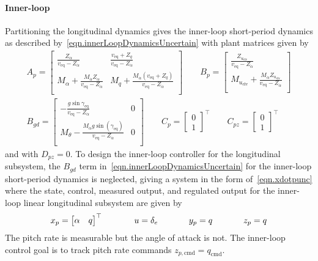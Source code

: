 \paragraph{Inner-loop}
Partitioning the longitudinal dynamics gives the inner-loop short-period dynamics as described by\ \eqref{eqn.innerLoopDynamicsUncertain} with plant matrices given by
\begin{equation*}
  \begin{gathered}
    A_{p} =
    \begin{bmatrix}
      \frac{Z_{\alpha}}{v_{\text{eq}}-Z_{\dot{\alpha}}} & \frac{v_{\text{eq}}+Z_{q}}{v_{\text{eq}}-Z_{\dot{\alpha}}} \\
      M_{\alpha}+\frac{M_{\dot{\alpha}}Z_{\alpha}}{v_{\text{eq}}-Z_{\dot{\alpha}}} & M_{q}+\frac{M_{\dot{\alpha}}(v_{\text{eq}}+Z_{q})}{v_{\text{eq}}-Z_{\dot{\alpha}}} \\
    \end{bmatrix}
    \qquad
    B_{p} =
    \begin{bmatrix}
      \frac{Z_{u_{\text{elv}}}}{v_{\text{eq}}-Z_{\dot{\alpha}}} \\
      M_{u_{\text{elv}}}+\frac{M_{\dot{\alpha}}Z_{u_{\text{elv}}}}{v_{\text{eq}}-Z_{\dot{\alpha}}} \\
    \end{bmatrix} \\[8pt]
    B_{gd} =
      \begin{bmatrix}
      -\frac{g\sin{\gamma_{\text{eq}}}}{v_{\text{eq}}-Z_{\dot{\alpha}}} & 0 \\
      M_{\theta}-\frac{M_{\dot{\alpha}}g\sin(\gamma_{\text{eq}})}{v_{\text{eq}}-Z_{\dot{\alpha}}} & 0 \\
    \end{bmatrix}
    \qquad
    C_{p} =
    \begin{bmatrix}
      0 \\
      1
    \end{bmatrix}^{\top}
    \qquad
    C_{pz} =
    \begin{bmatrix}
      0 \\
      1
    \end{bmatrix}^{\top}
  \end{gathered}
\end{equation*}
and with $D_{pz} = 0$.
To design the inner-loop controller for the longitudinal subsystem, the $B_{gd}$ term in\ \eqref{eqn.innerLoopDynamicsUncertain} for the inner-loop short-period dynamics is neglected, giving a system in the form of\ \eqref{eqn.xdotpunc} where the state, control, measured output, and regulated output for the inner-loop linear longitudinal subsystem are given by
\begin{equation*}
  x_{p} =
  \begin{bmatrix}
    \alpha & q
  \end{bmatrix}^{\top}
  \hspace{0.5in}
  u = \delta_{e}
  \hspace{0.5in}
  y_{p} = q
  \hspace{0.5in}
  z_{p} = q
\end{equation*}
The pitch rate is measurable but the angle of attack is not.
The inner-loop control goal is to track pitch rate commands $z_{p,\text{cmd}}=q_{\text{cmd}}$.

